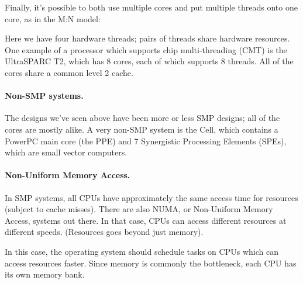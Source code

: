 \documentclass[a4paper]{report}
\begin{document}
Finally, it's possible to both use multiple cores and put multiple threads
onto one core, as in the M:N model:

\begin{center}
\end{center}
Here we have four hardware threads; pairs of threads share hardware
resources. One example of a processor which supports chip multi-threading
(CMT) is the UltraSPARC T2, which has 8 cores, each of which supports 8 
threads. All of the cores share a common level 2 cache.

\paragraph{Non-SMP systems.} The designs we've seen above have been
more or less SMP designs; all of the cores are mostly alike.
A very non-SMP system is the Cell, which contains a PowerPC main core
(the PPE) and 7 Synergistic Processing Elements (SPEs), which are
small vector computers.


\paragraph{Non-Uniform Memory Access.}
In SMP systems, all CPUs have approximately the same access time for resources
(subject to cache misses). There are also NUMA, or Non-Uniform Memory Access,
systems out there. In that case, CPUs can access different resources at different
speeds. (Resources goes beyond just memory).

In this case, the operating system should schedule tasks on CPUs which
can access resources faster.  Since memory is commonly the bottleneck,
each CPU has its own memory bank.
\end{document}
